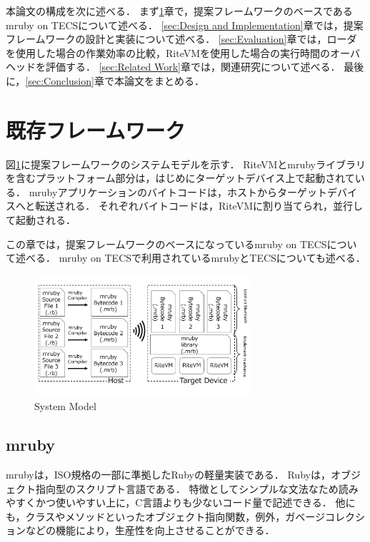 \documentclass[submit]{ipsj_v2/UTF8/ipsj}
\begin{document}
本論文の構成を次に述べる．
まず\ref{sec:Background}章で，提案フレームワークのベースであるmruby on TECSについて述べる．
\ref{sec:Design and Implementation}章では，提案フレームワークの設計と実装について述べる．
\ref{sec:Evaluation}章では，ローダを使用した場合の作業効率の比較，RiteVMを使用した場合の実行時間のオーバヘッドを評価する．
\ref{sec:Related Work}章では，関連研究について述べる．
最後に，\ref{sec:Conclusion}章で本論文をまとめる．


\section{既存フレームワーク}
\label{sec:Background}
図\ref{fig:proposed}に提案フレームワークのシステムモデルを示す．
RiteVMとmrubyライブラリを含むプラットフォーム部分は，はじめにターゲットデバイス上で起動されている．
mrubyアプリケーションのバイトコードは，ホストからターゲットデバイスへと転送される．
それぞれバイトコードは，RiteVMに割り当てられ，並行して起動される．

この章では，提案フレームワークのベースになっているmruby on TECSについて述べる．
mruby on TECSで利用されているmrubyとTECSについても述べる．

\begin{figure}[t]
    \centering
    \includegraphics[width=8cm,clip]{../EMSOFT2016/figure/proposed.pdf}
    \caption{System Model}
    \label{fig:proposed}
\end{figure}

\subsection{mruby}
mrubyは，ISO規格の一部に準拠したRubyの軽量実装である．
Ruby\cite{url:Ruby}は，オブジェクト指向型のスクリプト言語である．
特徴としてシンプルな文法なため読みやすくかつ使いやすい上に，C言語よりも少ないコード量で記述できる．
他にも，クラスやメソッドといったオブジェクト指向関数，例外，ガベージコレクションなどの機能により，生産性を向上させることができる．
\end{document}
